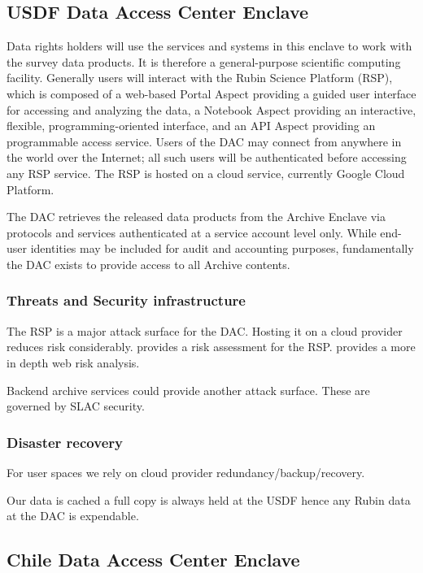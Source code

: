 \subsection{ USDF Data Access Center Enclave}
Data rights holders will use the services and systems in this enclave to work with the survey data products.
It is therefore a general-purpose scientific computing facility. Generally users will interact with the Rubin Science Platform (RSP), which is composed of a web-based Portal Aspect providing a guided user interface for accessing and analyzing the data, a Notebook Aspect providing an interactive, flexible, programming-oriented interface, and an API Aspect providing an programmable access service.
Users of the DAC may connect from anywhere in the world over the Internet; all such users will be authenticated before accessing any RSP service.
The RSP is hosted on a cloud service, currently  Google Cloud Platform.

The DAC retrieves the released data products from the Archive Enclave via protocols and services authenticated at a service account level only. While end-user identities may be included for audit and accounting purposes, fundamentally the DAC exists to provide access to all Archive contents.

\subsubsection{ Threats and Security infrastructure}
The RSP is a major attack surface for the DAC.
Hosting it on a cloud provider reduces risk considerably.
 provides a risk assessment for the RSP.
 provides a more in depth web risk analysis.

Backend archive services could provide another attack surface.
These are governed by SLAC security.

\subsubsection{Disaster recovery}
For user  spaces we rely on cloud provider redundancy/backup/recovery.

Our data is cached a full copy is always held at the USDF hence any Rubin data at the DAC is expendable.

\subsection{ Chile Data Access Center Enclave}
